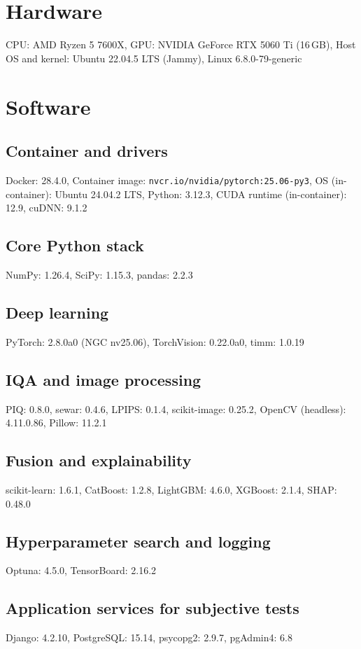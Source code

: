 \section{Hardware}

CPU: AMD Ryzen 5 7600X, GPU: NVIDIA GeForce RTX 5060 Ti (16\,GB), Host OS and kernel: Ubuntu 22.04.5 LTS (Jammy), Linux 6.8.0-79-generic
\section{Software}

\subsection*{Container and drivers}
Docker: 28.4.0, Container image: \texttt{nvcr.io/nvidia/pytorch:25.06-py3}, OS (in-container): Ubuntu 24.04.2 LTS, Python: 3.12.3, CUDA runtime (in-container): 12.9, cuDNN: 9.1.2
\subsection*{Core Python stack}
NumPy: 1.26.4, SciPy: 1.15.3, pandas: 2.2.3
\subsection*{Deep learning}
PyTorch: 2.8.0a0 (NGC nv25.06), TorchVision: 0.22.0a0, timm: 1.0.19
\subsection*{IQA and image processing}
PIQ: 0.8.0, sewar: 0.4.6, LPIPS: 0.1.4, scikit-image: 0.25.2, OpenCV (headless): 4.11.0.86, Pillow: 11.2.1
\subsection*{Fusion and explainability}
scikit-learn: 1.6.1, CatBoost: 1.2.8, LightGBM: 4.6.0, XGBoost: 2.1.4, SHAP: 0.48.0
\subsection*{Hyperparameter search and logging}
Optuna: 4.5.0, TensorBoard: 2.16.2
\subsection*{Application services for subjective tests}
Django: 4.2.10, PostgreSQL: 15.14, psycopg2: 2.9.7, pgAdmin4: 6.8


